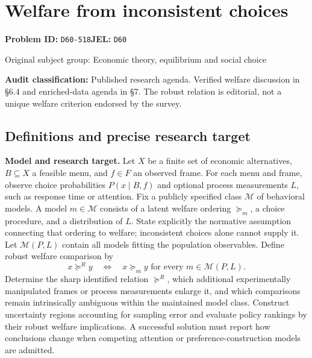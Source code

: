 \documentclass[11pt,a4paper]{article}
\begin{document}
\section*{Welfare from inconsistent choices}
\textbf{Problem ID:} \texttt{D60-518}\quad \textbf{JEL:} \texttt{D60}\par
\label{problem:OP-0273}
{\sffamily\small\color{muted}Original subject group: Economic theory, equilibrium and social choice\par}
\label{definitions:problem:30007554}
\textbf{Audit classification:} Published research agenda. Verified welfare discussion in §6.4 and enriched-data agenda in §7. The robust relation is editorial, not a unique welfare criterion endorsed by the survey.
\subsection*{Definitions and precise research target}
\textbf{Model and research target.} Let \(X\) be a finite set of economic alternatives, \(B\subseteq X\) a feasible menu, and \(f\in F\) an observed frame. For each menu and frame, observe choice probabilities \(P(x\mid B,f)\) and optional process measurements \(L\), such as response time or attention. Fix a publicly specified class \(\mathcal M\) of behavioral models. A model \(m\in\mathcal M\) consists of a latent welfare ordering \(\succeq_m\), a choice procedure, and a distribution of \(L\). State explicitly the normative assumption connecting that ordering to welfare; inconsistent choices alone cannot supply it. Let \(\mathcal M(P,L)\) contain all models fitting the population observables. Define robust welfare comparison by
\[
 x\succeq^R y\quad\Longleftrightarrow\quad x\succeq_m y\text{ for every }m\in\mathcal M(P,L).
\]
Determine the sharp identified relation \(\succeq^R\), which additional experimentally manipulated frames or process measurements enlarge it, and which comparisons remain intrinsically ambiguous within the maintained model class. Construct uncertainty regions accounting for sampling error and evaluate policy rankings by their robust welfare implications. A successful solution must report how conclusions change when competing attention or preference-construction models are admitted.
\end{document}
